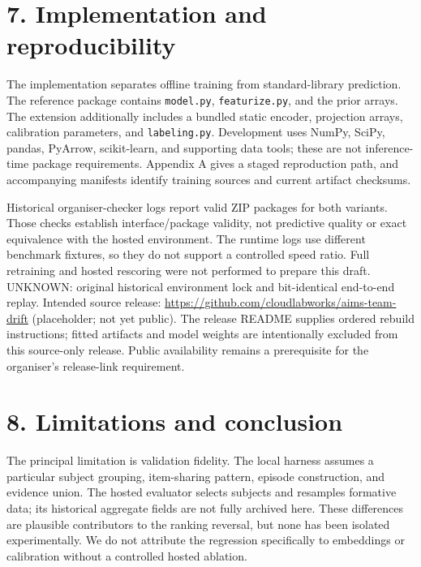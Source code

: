 \documentclass{article}
\providecommand{\passthrough}[1]{#1}
\begin{document}
\section{7. Implementation and reproducibility}\label{implementation-and-reproducibility}

The implementation separates offline training from standard-library prediction. The reference package contains \passthrough{\lstinline!model.py!}, \passthrough{\lstinline!featurize.py!}, and the prior arrays. The extension additionally includes a bundled static encoder, projection arrays, calibration parameters, and \passthrough{\lstinline!labeling.py!}. Development uses NumPy, SciPy, pandas, PyArrow, scikit-learn, and supporting data tools; these are not inference-time package requirements. Appendix A gives a staged reproduction path, and accompanying manifests identify training sources and current artifact checksums.

Historical organiser-checker logs report valid ZIP packages for both variants. Those checks establish interface/package validity, not predictive quality or exact equivalence with the hosted environment. The runtime logs use different benchmark fixtures, so they do not support a controlled speed ratio. Full retraining and hosted rescoring were not performed to prepare this draft. UNKNOWN: original historical environment lock and bit-identical end-to-end replay. Intended source release: \url{https://github.com/cloudlabworks/aims-team-drift} (placeholder; not yet public). The release README supplies ordered rebuild instructions; fitted artifacts and model weights are intentionally excluded from this source-only release. Public availability remains a prerequisite for the organiser's release-link requirement.

\section{8. Limitations and conclusion}\label{limitations-and-conclusion}

The principal limitation is validation fidelity. The local harness assumes a particular subject grouping, item-sharing pattern, episode construction, and evidence union. The hosted evaluator selects subjects and resamples formative data; its historical aggregate fields are not fully archived here. These differences are plausible contributors to the ranking reversal, but none has been isolated experimentally. We do not attribute the regression specifically to embeddings or calibration without a controlled hosted ablation.
\end{document}

